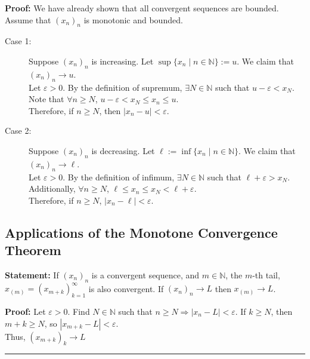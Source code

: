 \documentclass[10pt]{extarticle}
\newcommand{\N}{\mathbb{N}}
\begin{document}
  \textbf{Proof:} We have already shown that all convergent sequences are bounded.\\

    Assume that $(x_n)_n$ is monotonic and bounded.
    \begin{description}
      \item[Case 1:] Suppose $(x_n)_n$ is increasing. Let $\sup\{x_n\mid n\in\N\} := u$. We claim that $(x_n)_n \rightarrow u$.\\

        Let $\varepsilon > 0$. By the definition of supremum, $\exists N\in\N$ such that $u-\varepsilon < x_{N}$. Note that $\forall n\geq N$, $u-\varepsilon < x_N \leq x_n \leq u$.\\

        Therefore, if $n\geq N$, then $|x_n - u| < \varepsilon$.
      \item[Case 2:] Suppose $(x_n)_n$ is decreasing. Let $\ell := \inf\{x_n\mid n\in\N\}$. We claim that $(x_n)_n \rightarrow \ell$.\\

        Let $\varepsilon > 0$. By the definition of infimum, $\exists N\in\N$ such that $\ell + \varepsilon > x_N$. Additionally, $\forall n \geq N$, $\ell \leq x_n \leq x_N < \ell + \varepsilon$.\\

        Therefore, if $n \geq N$, $|x_n - \ell| < \varepsilon$.
    \end{description}
  \subsection{Applications of the Monotone Convergence Theorem}%
  \textbf{Statement:} If $(x_n)_n$ is a convergent sequence, and $m\in\N$, the $m$-th tail, $x_{(m)} = (x_{m+k})_{k=1}^{\infty}$ is also convergent. If $(x_n)_n \rightarrow L$ then $x_{(m)}\rightarrow L$.

  \textbf{Proof:} Let $\varepsilon > 0$. Find $N\in\N$ such that $n\geq N \Rightarrow |x_n - L| < \varepsilon$. If $k \geq N$, then $m + k \geq N$, so $|x_{m+k}-L| < \varepsilon$.\\

      Thus, $\left(x_{m+k}\right)_k \rightarrow L$
      \begin{center}
        \rule{0.5\textwidth}{0.4pt}
      \end{center}
\end{document}
